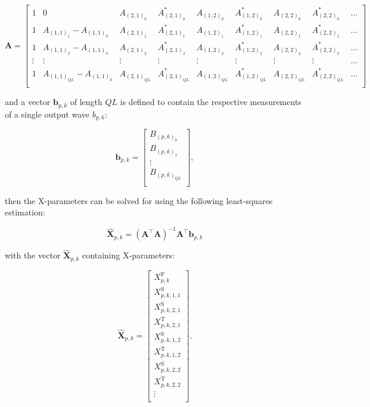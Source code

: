 \documentclass[../thesis/thesis.tex]{subfiles}
\begin{document}
\begin{equation}
	\bm{A} =
	\begin{bmatrix}
		1 & 0 & A_{(2,1)_0} & A^*_{(2,1)_0} & A_{(1,2)_0} & A^*_{(1,2)_0} & A_{(2,2)_0} & A^*_{(2,2)_0} & \dots \\
		1 & A_{(1,1)_1} - A_{(1,1)_0} & A_{(2,1)_1} & A^*_{(2,1)_1} & A_{(1,2)_1} & A^*_{(1,2)_1} & A_{(2,2)_1} & A^*_{(2,2)_1} & \dots \\
		1 & A_{(1,1)_2} - A_{(1,1)_0} & A_{(2,1)_2} & A^*_{(2,1)_2} & A_{(1,2)_2} & A^*_{(1,2)_2} & A_{(2,2)_2} & A^*_{(2,2)_2} & \dots \\
		\vdots & \vdots & \vdots & \vdots & \vdots & \vdots & \vdots & \vdots & \dots \\
		1 & A_{(1,1)_{QL}} - A_{(1,1)_0} & A_{(2,1)_{QL}} & A^*_{(2,1)_{QL}} & A_{(1,2)_{QL}} & A^*_{(1,2)_{QL}} & A_{(2,2)_{QL}} & A^*_{(2,2)_{QL}} & \dots \\
	\end{bmatrix}
\end{equation}

and a vector $\bm{b}_{p,k}$ of length $QL$ is defined to contain the respective measurements of a single output wave $b_{p,k}$:

\begin{equation}
	\bm{b}_{p,k} =
	\begin{bmatrix}
		B_{(p,k)_0} \\
		B_{(p,k)_1} \\
		\vdots \\
		B_{(p,k)_{QL}} \\
	\end{bmatrix},
\end{equation}

then the X-parameters can be solved for using the following least-squares estimation:

\begin{equation}
	\bm{\hat{X}}_{p,k} = (\bm{A}^\top \bm{A})^{-1}\bm{A}^\top \bm{b}_{p,k}
\end{equation}

with the vector $\bm{\hat{X}}_{p,k}$ containing X-parameters:

\begin{equation}
	\bm{\hat{X}}_{p,k} = 
	\begin{bmatrix}
		X^\textrm{F}_{p,k} \\
		X^\textrm{S}_{p,k, 1, 1} \\
		X^\textrm{S}_{p,k, 2, 1} \\
		X^\textrm{T}_{p,k, 2, 1} \\
		X^\textrm{S}_{p,k, 1, 2} \\
		X^\textrm{T}_{p,k, 1, 2} \\
		X^\textrm{S}_{p,k, 2, 2} \\
		X^\textrm{T}_{p,k, 2, 2} \\
		\vdots \\
	\end{bmatrix}.
\end{equation}
\end{document}
